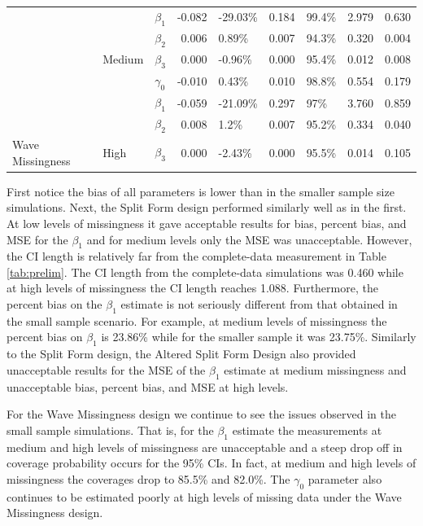 \documentclass{svjour3}\usepackage[]{graphicx}\usepackage[]{color}
\newenvironment{knitrout}{}{} %
\begin{document}
\begin{knitrout}
\begin{table}[!h]
{\begin{tabular}[t]{l|l|l|r|l|r|l|r|r}
 &  & $\beta_1$ & -0.082 & -29.03\% & 0.184 & 99.4\% & 2.979 & 0.630\\

 &  & $\beta_2$ & 0.006 & 0.89\% & 0.007 & 94.3\% & 0.320 & 0.004\\

 & \multirow{-4}{*}{\raggedright\arraybackslash Medium} & $\beta_3$ & 0.000 & -0.96\% & 0.000 & 95.4\% & 0.012 & 0.008\\

 &  & $\gamma_0$ & -0.010 & 0.43\% & 0.010 & 98.8\% & 0.554 & 0.179\\

 &  & $\beta_1$ & -0.059 & -21.09\% & 0.297 & 97\% & 3.760 & 0.859\\

 &  & $\beta_2$ & 0.008 & 1.2\% & 0.007 & 95.2\% & 0.334 & 0.040\\

\multirow{-12}{*}{\raggedright\arraybackslash Wave Missingness} & \multirow{-4}{*}{\raggedright\arraybackslash High} & $\beta_3$ & 0.000 & -2.43\% & 0.000 & 95.5\% & 0.014 & 0.105\\
\hline
\end{tabular}}
\end{table}


\end{knitrout}

First notice the bias of all parameters is lower than in the smaller sample size simulations. Next, the Split Form design performed similarly well as in the first. At low levels of missingness it gave acceptable results for bias, percent bias, and MSE for the $\beta_1$ and for medium levels only the MSE was unacceptable. However, the CI length is relatively far from the complete-data measurement in Table \ref{tab:prelim}. The CI length from the complete-data simulations was 0.460 while at high levels of missingness the CI length reaches 1.088. Furthermore, the percent bias on the $\beta_1$ estimate is not seriously different from that obtained in the small sample scenario. For example, at medium levels of missingness the percent bias on $\beta_1$ is 23.86\% while for the smaller sample it was 23.75\%.
Similarly to the Split Form design, the Altered Split Form Design also provided unacceptable results for the MSE of the $\beta_1$ estimate at medium missingness and unacceptable bias, percent bias, and MSE at high levels.  \par
For the Wave Missingness design we continue to see the issues observed in the small sample simulations. That is, for the $\beta_1$ estimate the measurements at medium and high levels of missingness are unacceptable and a steep drop off in coverage probability occurs for the 95\% CIs. In fact, at medium and high levels of missingness the coverages drop to 85.5\% and 82.0\%. The $\gamma_0$ parameter also continues to be estimated poorly at high levels of missing data under the Wave Missingness design. \par
\end{document}
